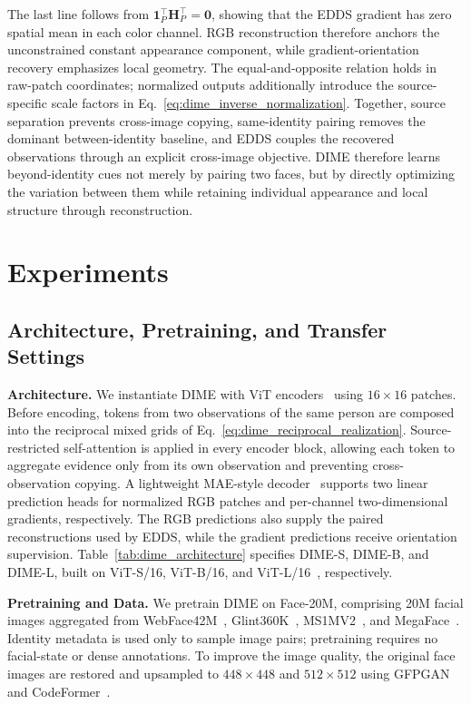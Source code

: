 \documentclass[10pt,journal,compsoc]{IEEEtran}
\begin{document}
The last line follows from $\mathbf{1}_{P}^{\top}\mathbf{H}_{P}^{\top}=\mathbf{0}$, showing that the EDDS gradient has zero spatial mean in each color channel. RGB reconstruction therefore anchors the unconstrained constant appearance component, while gradient-orientation recovery emphasizes local geometry. The equal-and-opposite relation holds in raw-patch coordinates; normalized outputs additionally introduce the source-specific scale factors in Eq.~\eqref{eq:dime_inverse_normalization}. Together, source separation prevents cross-image copying, same-identity pairing removes the dominant between-identity baseline, and EDDS couples the recovered observations through an explicit cross-image objective. DIME therefore learns beyond-identity cues not merely by pairing two faces, but by directly optimizing the variation between them while retaining individual appearance and local structure through reconstruction.


\section{Experiments}

\subsection{Architecture, Pretraining, and Transfer Settings}
\label{sec:implementation_settings}

\noindent\textbf{Architecture.}
We instantiate DIME with ViT encoders~\cite{dosovitskiy2020image,touvron2021training} using $16\times16$ patches. Before encoding, tokens from two observations of the same person are composed into the reciprocal mixed grids of Eq.~\eqref{eq:dime_reciprocal_realization}. Source-restricted self-attention is applied in every encoder block, allowing each token to aggregate evidence only from its own observation and preventing cross-observation copying. A lightweight MAE-style decoder~\cite{he2022masked} supports two linear prediction heads for normalized RGB patches and per-channel two-dimensional gradients, respectively. The RGB predictions also supply the paired reconstructions used by EDDS, while the gradient predictions receive orientation supervision. Table~\ref{tab:dime_architecture} specifies DIME-S, DIME-B, and DIME-L, built on ViT-S/16, ViT-B/16, and ViT-L/16~\cite{touvron2021training}, respectively.


\noindent\textbf{Pretraining and Data.}
We pretrain DIME on Face-20M, comprising 20M facial images aggregated from WebFace42M~\cite{zhu2023webface260m}, Glint360K~\cite{an2022killing}, MS1MV2~\cite{deng2022arcface}, and MegaFace~\cite{kemelmacher2016megaface}. Identity metadata is used only to sample image pairs; pretraining requires no facial-state or dense annotations. To improve the image quality, the original face images are restored and upsampled to $448\times448$ and $512\times512$ using GFPGAN~\cite{wang2021towards} and CodeFormer~\cite{zhou2022towards}.
\end{document}

